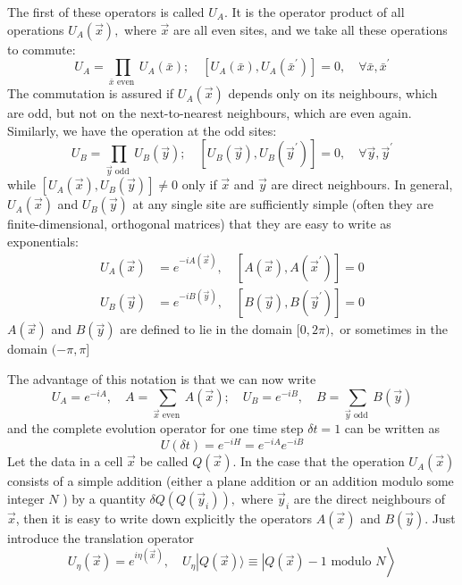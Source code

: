 \documentclass[main.tex]{subfiles}
\begin{document}
The first of these operators is called $U_{A} .$ It is the operator product of all operations $U_{A}(\vec{x}),$ where $\vec{x}$ are all even sites, and we take all these operations to commute:
$$
U_{A}=\prod_{\bar{x} \text { even }} U_{A}(\bar{x}) ; \quad\left[U_{A}(\bar{x}), U_{A}\left(\bar{x}^{\prime}\right)\right]=0, \quad \forall \bar{x}, \bar{x}^{\prime}
$$
The commutation is assured if $U_{A}(\vec{x})$ depends only on its neighbours, which are odd, but not on the next-to-nearest neighbours, which are even again. Similarly, we have the operation at the odd sites:
$$
U_{B}=\prod_{\vec{y} \text { odd }} U_{B}(\vec{y}) ; \quad\left[U_{B}(\vec{y}), U_{B}\left(\vec{y}^{\prime}\right)\right]=0, \quad \forall \vec{y}, \vec{y}^{\prime}
$$
while $\left[U_{A}(\vec{x}), U_{B}(\vec{y})\right] \neq 0$ only if $\vec{x}$ and $\vec{y}$ are direct neighbours. In general, $U_{A}(\vec{x})$ and $U_{B}(\vec{y})$ at any single site are sufficiently simple (often they are finite-dimensional, orthogonal matrices) that they are easy to write as exponentials:
$$
\begin{aligned}
U_{A}(\vec{x}) &=e^{-i A(\vec{x})}, \quad\left[A(\vec{x}), A\left(\vec{x}^{\prime}\right)\right]=0 \\
U_{B}(\vec{y}) &=e^{-i B(\vec{y})}, \quad\left[B(\vec{y}), B\left(\vec{y}^{\prime}\right)\right]=0
\end{aligned}
$$
$A(\vec{x})$ and $B(\vec{y})$ are defined to lie in the domain $[0,2 \pi),$ or sometimes in the domain $(-\pi, \pi]$

The advantage of this notation is that we can now write
$$
U_{A}=e^{-i A}, \quad A=\sum_{\vec{x} \text { even }} A(\vec{x}) ; \quad U_{B}=e^{-i B}, \quad B=\sum_{\vec{y} \text { odd }} B(\vec{y})
$$
and the complete evolution operator for one time step $\delta t=1$ can be written as
$$
U(\delta t)=e^{-i H}=e^{-i A} e^{-i B}
$$
Let the data in a cell $\vec{x}$ be called $Q(\vec{x})$. In the case that the operation $U_{A}(\vec{x})$ consists of a simple addition (either a plane addition or an addition modulo some integer $N$ ) by a quantity $\delta Q\left(Q\left(\vec{y}_{i}\right)\right),$ where $\vec{y}_{i}$ are the direct neighbours of $\vec{x}$, then it is easy to write down explicitly the operators $A(\vec{x})$ and $B(\vec{y})$. Just introduce the translation operator
$$
\left.U_{\eta}(\vec{x})=e^{i \eta(\vec{x})}, \quad U_{\eta}|Q(\vec{x})\rangle \equiv | Q(\vec{x})-1 \text { modulo } N\right\rangle
$$
\end{document}
